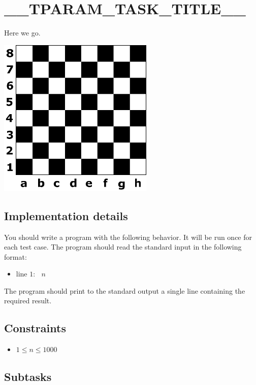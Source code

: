 \documentclass[12pt,a4paper]{article}
\begin{document}


\section*{__TPARAM_TASK_TITLE__}

Here we go.

\begin{center}
\includegraphics[width=.5\textwidth]{board.png}
\end{center}

\subsection*{Implementation details}

You should write a program with the following behavior.
It will be run once for each test case.
The program should read the standard input in the following format: 
\begin{itemize}
    \item line $1$:  $\;\;n$
\end{itemize}
    
The program should print to the standard output a single line containing the required result.

\subsection*{Constraints}

\begin{itemize}
    \item $1 \leq n \leq  1000$
\end{itemize}

\subsection*{Subtasks}
\end{document}
